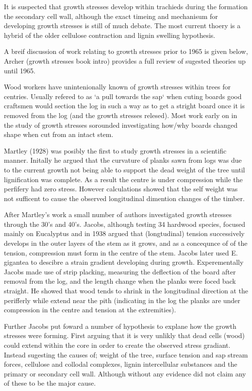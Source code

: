 \documentclass{article}
\begin{document}
It is suspected that growth stresses develop within trachieds during the
formation the secondary cell wall, although the exact timeing and mechanisum for
developing growth stresses is still of much debate. The most current thoery is
a hybrid of the older cellulose contraction and lignin swelling hypothesis.

A breif discussion of work relating to growth stresses prior to 1965 is given
below, Archer (growth stresses book intro) provides a full review of sugested theories
up until 1965.

Wood workers have unintenionally known of growth stresses within trees
for centries. Usually refered to as `a pull towards the sap` when cuting boards good
craftsmen would section the log in such a way as to get a stright board once it
is removed from the log (and the growth stresses relesed). Most work early on in
the study of growth stresses sorounded investigating how/why boards changed
shape when cut from an intact stem.

Martley (1928) was posibly the first to study growth stresses in a scientific
manner. Initally he argued that the curvature of planks sawn from logs was due
to the current growth not being able to support the dead weight of the tree until
lignification was complete. As a result the centre is under compression while
the perfifery had zero stress. However calculations showed that the self weight
was not sufficent to cause the observed longitudinal dimention changes of the
timber.

After Martley's work a small number of authors investigated growth stresses
through the 30's and 40's. Jacobs, although testing 34 hardwood species, focused
mainly on Eucalyptus and in 1938 argued that (longtudinal) tension successively
develops in the outer layers of the stem as it grows, and as a concequnce of of
the tension, compression must form in the centre of the stem. Jacobs later used
E. gigantea to descibre a strain gradient developing during growth.
Experementally Jacobs made use of strip placking, measuring the deflection of
the board after removal from the log, and the length change when the planks were
foced back straight. He showed that wood tends to shrink in the longitudinal
direction at the perifferly while extend near the pith (indicating in the log
the planks are under compression in the centre and tension at the extremities).

Further Jacobs put foward a number of hypothesis to explane how the growth
stresses were forming. First arguing that it is very unlikly that dead cells
(wood) could extend within the core in order to create the observed stress
gradiant. Instead sugesting the causes of; weight of the tree, surface tension
and sap stream forces, cellulose and collodal complexes, lignin intercellular
substances and the primary or secondary cell wall. Although without any evidence
did not claim any of these to be the major cause.
\end{document}
